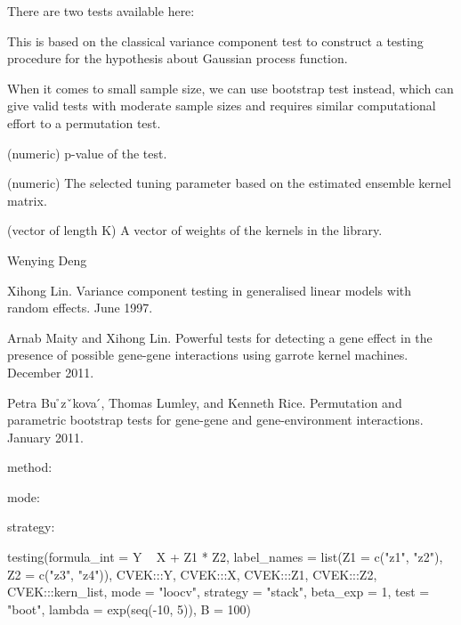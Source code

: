\documentclass[a4paper]{book}
\begin{document}
%
\begin{Details}\relax
There are two tests available here:


This is based on the classical variance component test to construct a
testing procedure for the hypothesis about Gaussian process function.


When it comes to small sample size, we can use bootstrap test instead, which
can give valid tests with moderate sample sizes and requires similar
computational effort to a permutation test.
\end{Details}
%
\begin{Value}
\begin{ldescription}
\item[\code{pvalue}] (numeric) p-value of the test.
\item[\code{lambda}] (numeric) The selected tuning parameter based on the estimated
ensemble kernel matrix.\item[\code{u\_hat}] (vector of length K) A vector of
weights of the kernels in the library.
\end{ldescription}
\end{Value}
%
\begin{Author}\relax
Wenying Deng
\end{Author}
%
\begin{References}\relax
Xihong Lin. Variance component testing in generalised linear
models with random effects. June 1997.

Arnab Maity and Xihong Lin. Powerful tests for detecting a gene effect in
the presence of possible gene-gene interactions using garrote kernel
machines. December 2011.

Petra Bu ̊zˇkova ́, Thomas Lumley, and Kenneth Rice. Permutation and
parametric bootstrap tests for gene-gene and gene-environment interactions.
January 2011.
\end{References}
%
\begin{SeeAlso}\relax
method: 

mode: 

strategy: 
\end{SeeAlso}
%
\begin{Examples}
\begin{ExampleCode}



testing(formula_int = Y ~ X + Z1 * Z2,
label_names = list(Z1 = c("z1", "z2"), Z2 = c("z3", "z4")),
CVEK:::Y, CVEK:::X, CVEK:::Z1, CVEK:::Z2, CVEK:::kern_list, 
mode = "loocv", strategy = "stack",
beta_exp = 1, test = "boot", lambda = exp(seq(-10, 5)), B = 100)



\end{ExampleCode}
\end{Examples}
\end{document}
